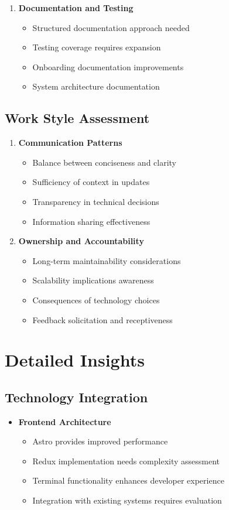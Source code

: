 \documentclass[10pt,a4paper]{article}
\begin{document}
\begin{multicols}{2}
\begin{enumerate}
  \item \textbf{Documentation and Testing}
    \begin{itemize}
      \item Structured documentation approach needed
      \item Testing coverage requires expansion
      \item Onboarding documentation improvements
      \item System architecture documentation
    \end{itemize}
\end{enumerate}

\subsection*{Work Style Assessment}
\begin{enumerate}\small
  \item \textbf{Communication Patterns}
    \begin{itemize}
      \item Balance between conciseness and clarity
      \item Sufficiency of context in updates
      \item Transparency in technical decisions
      \item Information sharing effectiveness
    \end{itemize}
  
  \item \textbf{Ownership and Accountability}
    \begin{itemize}
      \item Long-term maintainability considerations
      \item Scalability implications awareness
      \item Consequences of technology choices
      \item Feedback solicitation and receptiveness
    \end{itemize}
\end{enumerate}

\section*{Detailed Insights}
\subsection*{Technology Integration}
\begin{itemize}\small
  \item \textbf{Frontend Architecture}
    \begin{itemize}
      \item Astro provides improved performance
      \item Redux implementation needs complexity assessment
      \item Terminal functionality enhances developer experience
      \item Integration with existing systems requires evaluation
    \end{itemize}
  

\end{itemize}
\end{multicols}
\end{document}
